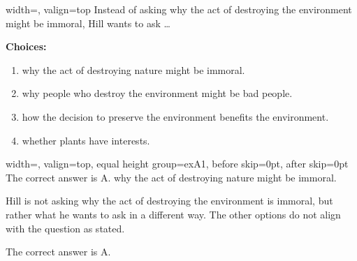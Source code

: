 \begin{bluebox}[Question]{width=\linewidth, valign=top}
Instead of asking why the act of destroying the environment might be immoral, Hill wants to ask \dots

\medskip
\noindent\textbf{Choices:}
\begin{enumerate}[label=\Alph*)]
  \item why the act of destroying nature might be immoral.
  \item why people who destroy the environment might be bad people.
  \item how the decision to preserve the environment benefits the environment.
  \item whether plants have interests.
\end{enumerate}
\end{bluebox}
\noindent
\begin{minipage}[t]{0.49\linewidth}
\begin{bluebox}{width=\linewidth, valign=top, equal height group=exA1, before skip=0pt, after skip=0pt}
The correct answer is A. why the act of destroying nature might be immoral.

Hill is not asking why the act of destroying the environment is immoral, but rather what he wants to ask in a different way. The other options do not align with the question as stated.

The correct answer is A.
\end{bluebox}
\end{minipage}
\hfill
